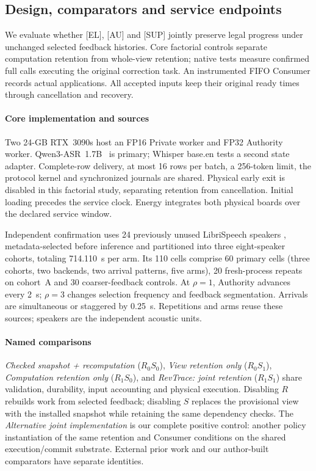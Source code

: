 \subsection{Design, comparators and service endpoints}
We evaluate whether [EL], [AU] and [SUP] jointly preserve legal progress
under unchanged selected feedback histories. Core factorial controls
separate computation retention from whole-view retention; native tests
measure confirmed full calls executing the original correction task.
An instrumented FIFO Consumer records actual applications. All accepted
inputs keep their original ready times through cancellation and recovery.

\paragraph{Core implementation and sources}
Two 24-GB RTX~3090s host an FP16 Private worker and FP32 Authority worker.
Qwen3-ASR~1.7B~\cite{shi2026qwen3asr} is primary; Whisper base.en
\cite{radford2023whisper} tests a second state adapter. Complete-row
delivery, at most 16 rows per batch, a 256-token limit, the protocol kernel
and synchronized journals are shared. Physical early exit is disabled
in this factorial study, separating retention from cancellation.
Initial loading precedes the service clock. Energy integrates both
physical boards over the declared service window.

Independent confirmation uses 24 previously unused LibriSpeech speakers
\cite{panayotov2015librispeech}, metadata-selected before inference and
partitioned into three eight-speaker cohorts, totaling 714.110~s per arm.
Its 110 cells comprise 60 primary cells (three cohorts, two backends, two
arrival patterns, five arms), 20 fresh-process repeats on cohort~A and 30
coarser-feedback controls. At $\rho=1$, Authority advances every 2~s;
$\rho=3$ changes selection frequency and feedback segmentation. Arrivals
are simultaneous or staggered by 0.25~s. Repetitions and arms reuse these
sources; speakers are the independent acoustic units.

\paragraph{Named comparisons}
\emph{Checked snapshot + recomputation} ($R_0S_0$), \emph{View retention
only} ($R_0S_1$), \emph{Computation retention only} ($R_1S_0$), and
\emph{RevTrace: joint retention} ($R_1S_1$) share validation, durability,
input accounting and physical execution. Disabling $R$ rebuilds work
from selected feedback; disabling $S$ replaces the provisional view
with the installed snapshot while retaining the same dependency checks.
The \emph{Alternative joint implementation} is our complete positive
control: another policy instantiation of the same retention and Consumer
conditions on the shared execution/commit substrate. External prior work
and our author-built comparators have separate identities.

